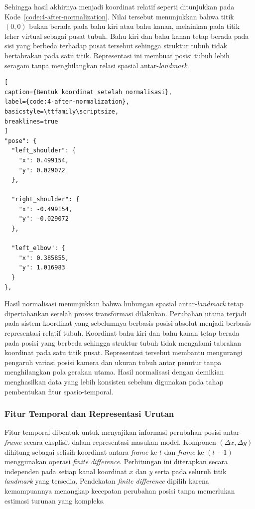 Sehingga hasil akhirnya menjadi koordinat relatif seperti ditunjukkan pada Kode~\ref{code:4-after-normalization}. 
Nilai tersebut menunjukkan bahwa titik $(0,0)$ bukan berada pada bahu kiri atau bahu kanan, melainkan pada titik leher virtual sebagai pusat tubuh. 
Bahu kiri dan bahu kanan tetap berada pada sisi yang berbeda terhadap pusat tersebut sehingga struktur tubuh tidak bertabrakan pada satu titik. 
Representasi ini membuat posisi tubuh lebih seragam tanpa menghilangkan relasi spasial antar-\textit{landmark}.

\begin{lstlisting}[
caption={Bentuk koordinat setelah normalisasi},
label={code:4-after-normalization},
basicstyle=\ttfamily\scriptsize,
breaklines=true
]
"pose": {
  "left_shoulder": {
    "x": 0.499154,
    "y": 0.029072
  },

  "right_shoulder": {
    "x": -0.499154,
    "y": -0.029072
  },

  "left_elbow": {
    "x": 0.385855,
    "y": 1.016983
  }
},
\end{lstlisting}

Hasil normalisasi menunjukkan bahwa hubungan spasial antar-\textit{landmark} tetap dipertahankan setelah proses transformasi dilakukan. 
Perubahan utama terjadi pada sistem koordinat yang sebelumnya berbasis posisi absolut menjadi berbasis representasi relatif tubuh. 
Koordinat bahu kiri dan bahu kanan tetap berada pada posisi yang berbeda sehingga struktur tubuh tidak mengalami tabrakan koordinat pada satu titik pusat. 
Representasi tersebut membantu mengurangi pengaruh variasi posisi kamera dan ukuran tubuh antar penutur tanpa menghilangkan pola gerakan utama. 
Hasil normalisasi dengan demikian menghasilkan data yang lebih konsisten sebelum digunakan pada tahap pembentukan fitur spasio-temporal.

\subsubsection{Fitur Temporal dan Representasi Urutan}
\label{subsubsec:fitur-temporal}
Fitur temporal dibentuk untuk menyajikan informasi perubahan posisi antar-\textit{frame} secara eksplisit dalam representasi masukan model. 
Komponen $(\Delta x, \Delta y)$ dihitung sebagai selisih koordinat antara \textit{frame} ke-$t$ dan \textit{frame} ke-$(t-1)$ menggunakan operasi \textit{finite difference}. 
Perhitungan ini diterapkan secara independen pada setiap kanal koordinat $x$ dan $y$ serta pada seluruh titik \textit{landmark} yang tersedia. 
Pendekatan \textit{finite difference} dipilih karena kemampuannya menangkap kecepatan perubahan posisi tanpa memerlukan estimasi turunan yang kompleks.

